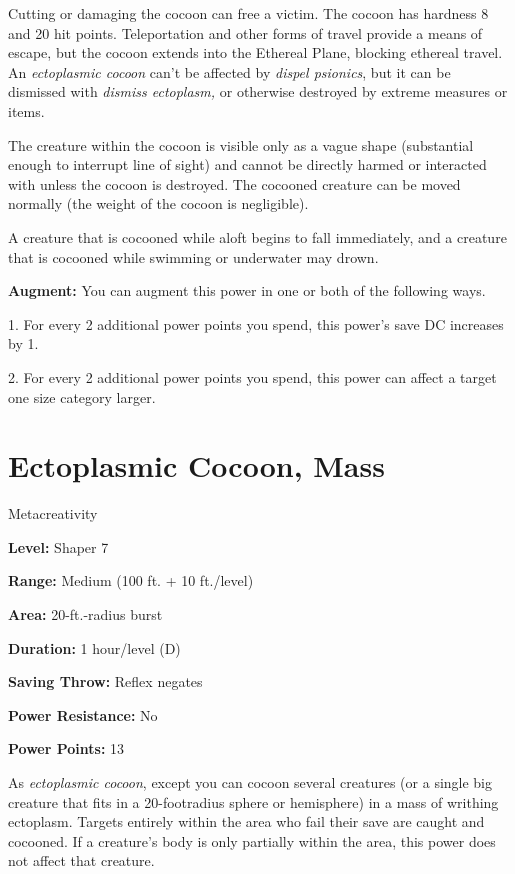 \documentclass{article}
\begin{document}
Cutting or damaging the cocoon can free a victim. The cocoon has hardness 8 and 
20 hit points. Teleportation and other forms of travel provide a means of escape, 
but the cocoon extends into the Ethereal Plane, blocking ethereal travel. An \textit{ectoplasmic 
cocoon }can't be affected by \textit{dispel psionics}, but it can be dismissed 
with \textit{dismiss ectoplasm, }or otherwise destroyed by extreme measures or 
items.

The creature within the cocoon is visible only as a vague shape (substantial enough 
to interrupt line of sight) and cannot be directly harmed or interacted with unless 
the cocoon is destroyed. The cocooned creature can be moved normally (the weight 
of the cocoon is negligible).

A creature that is cocooned while aloft begins to fall immediately, and a creature 
that is cocooned while swimming or underwater may drown.

\textbf{Augment:} You can augment this power in one or both of the following ways.

1. For every 2 additional power points you spend, this power's save DC increases 
by 1.

2. For every 2 additional power points you spend, this power can affect a target 
one size category larger.

\vspace{12pt}
\section*{Ectoplasmic Cocoon, Mass}

Metacreativity

\textbf{Level:} Shaper 7

\textbf{Range:} Medium (100 ft. + 10 ft./level)

\textbf{Area:} 20-ft.-radius burst

\textbf{Duration:} 1 hour/level (D)

\textbf{Saving Throw:} Reflex negates

\textbf{Power Resistance:} No

\textbf{Power Points:} 13

As \textit{ectoplasmic cocoon}, except you can cocoon several creatures (or a single 
big creature that fits in a 20-footradius sphere or hemisphere) in a mass of writhing 
ectoplasm. Targets entirely within the area who fail their save are caught and 
cocooned. If a creature's body is only partially within the area, this power does 
not affect that creature.
\end{document}
